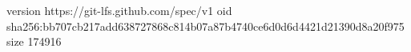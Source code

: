 version https://git-lfs.github.com/spec/v1
oid sha256:bb707cb217add638727868c814b07a87b4740ce6d0d6d4421d21390d8a20f975
size 174916
